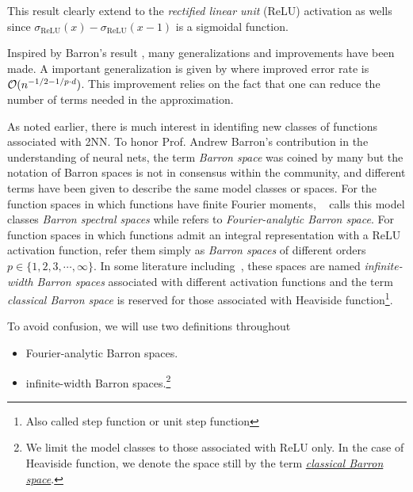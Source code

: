 This result clearly extend to the \textit{rectified linear unit} (ReLU)
activation as wells since $\sigma_{\text{ReLU}}(x) - \sigma_{\text{ReLU}}(x-1)$
is a sigmoidal function.


Inspired by Barron's result \citep{eRepresentationFormulasPointwise2020,
carageaNeuralNetworkApproximation2022}, many generalizations and
improvements have been made. A important generalization is given by
\cite{makovozRandomApproximantsNeural1996} where improved error rate is
$\mathcal{O}(n^{-1/2-1 / p\cdot d})$. This improvement relies on the fact that one can
reduce the number of terms needed in the approximation. 

As noted earlier, there is much interest in identifing new classes of functions
associated with 2NN. To honor Prof. Andrew Barron's contribution in the
understanding of neural nets, the term \textit{Barron space} was coined by many
but the notation of Barron spaces is not in consensus within the community, and
different terms have been given to describe the same model classes or spaces.
For the function spaces in which functions have finite Fourier moments,
~\cite{xuFiniteNeuronMethod2020} calls this model classes \textit{Barron
spectral spaces} while \cite{carageaNeuralNetworkApproximation2022} refers to
\textit{Fourier-analytic Barron space}.  For function spaces in which functions
admit an integral representation with a ReLU activation function,
\cite{eBarronSpaceFlowinduced2021} refer them simply as \textit{Barron spaces}
of different orders $p \in \{1, 2, 3, \cdots, \infty\}$. In some literature
including~\cite{carageaNeuralNetworkApproximation2022}, these spaces are named
\textit{infinite-width Barron spaces} associated with different activation
functions and the term \textit{classical Barron space} is reserved for those
associated with Heaviside function\footnote{Also called step function or unit
step function}.

To avoid confusion, we will use two definitions throughout
\begin{itemize}
    \item Fourier-analytic Barron spaces.
    \item infinite-width Barron spaces.\footnote{
        We limit the model classes to those associated with ReLU only. In the 
        case of Heaviside function, we denote the space still by the term 
        \hyperref[def:heaviside_space]{\textit{classical Barron space}}.
    }
\end{itemize}

